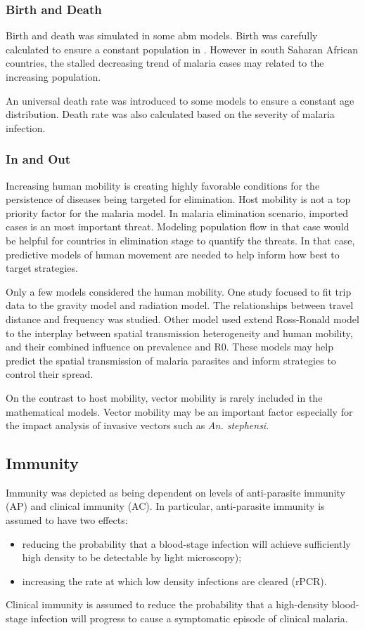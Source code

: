 \documentclass[a4paper, 12pt, twoside]{article}
\begin{document}
\subsubsection{Birth and Death}
Birth and death was simulated in some \gls{abm} models.
Birth was carefully calculated to ensure a constant population in .
However in south Saharan African countries, the stalled decreasing trend of malaria cases may related to the increasing population.

An universal death rate was introduced to some models  to ensure a constant age distribution. Death rate was also calculated based on the severity of malaria infection.

\subsubsection{In and Out}
Increasing human mobility is creating highly favorable conditions for the persistence of diseases being targeted for elimination.
Host mobility is not a top priority factor for the malaria model.
In malaria elimination scenario, imported cases is an most important threat.
Modeling population flow in that case would be helpful for countries in elimination stage to quantify the threats.
In that case, predictive models of human movement are needed to help inform how best to target strategies.

Only a few models\cite{Zhu2015a} considered the human mobility.
One study focused to fit trip data to the gravity model and radiation model\cite{Marshall2018}.
The relationships between travel distance and frequency was studied.
Other model\cite{acevedo_spatial_2015} used extend Ross-Ronald model to the interplay between spatial transmission heterogeneity and human mobility, and their combined influence on prevalence and \gls{R0}.
These models may help predict the spatial transmission of malaria parasites and inform strategies to control their spread.

On the contrast to host mobility, vector mobility is rarely included in the mathematical models.
Vector mobility may be an important factor especially for the impact analysis of invasive vectors such as \textit{An. stephensi}.

\subsection{Immunity}

Immunity was depicted as being dependent on levels of anti-parasite immunity (AP) and clinical immunity (AC).
In particular, anti-parasite immunity is assumed to have two effects:
\begin{itemize}
  \item reducing the probability that a blood-stage infection will achieve sufficiently high density to be detectable by light microscopy);
  \item increasing the rate at which low density infections are cleared (rPCR).
\end{itemize} 
Clinical immunity is assumed to reduce the probability that a high-density blood-stage infection will progress to cause a symptomatic episode of clinical malaria.
\end{document}
